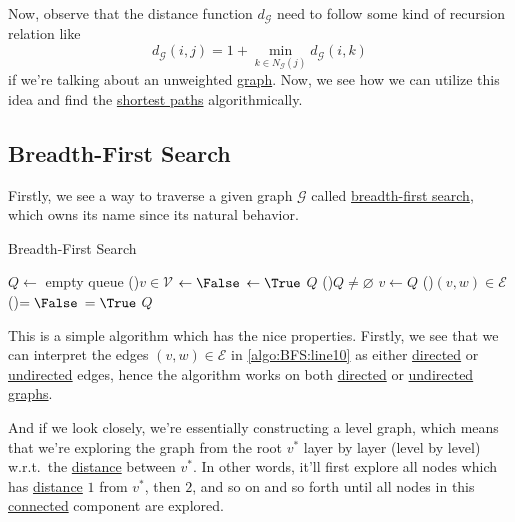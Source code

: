 Now, observe that the distance function \(d_{\mathcal{G} } \) need to follow some kind of recursion relation like
\[
	d_{\mathcal{G} } (i, j) = 1 + \min_{k\in N_{\mathcal{G} } (j)} d_{\mathcal{G} } (i, k)
\]
if we're talking about an unweighted \hyperref[def:graph]{graph}. Now, we see how we can utilize this idea and find the \hyperref[def:shortest-path]{shortest paths} algorithmically.

\subsection{Breadth-First Search}
Firstly, we see a way to traverse a given graph \(\mathcal{G} \) called \hyperref[algo:BFS]{breadth-first search}, which owns its name since its natural behavior.

\begin{algorithm}[H]\label{algo:BFS}
	\DontPrintSemicolon{}
	\caption{Breadth-First Search}
	\BlankLine
	\(Q\gets \) empty queue
	\For(){\(v\in \mathcal{V} \)}{
		\(\gets \False\)
	}
	\;
	\(\gets \True\) 
	\(Q\)\;
	\;
	\While(){\(Q\neq \varnothing \)}{
		\(v\gets Q\)\pop{}\;
		\For(\label{algo:BFS:line10}){\((v, w)\in\mathcal{E}\)}{
			\If(){\(= \False\)}{
				\(=\True\)
				\(Q\)\;
			}
		}
	}
	\Return{}\;
\end{algorithm}

This is a simple algorithm which has the nice properties. Firstly, we see that we can interpret the edges \((v, w)\in \mathcal{E} \) in \autoref{algo:BFS:line10} as either \hyperref[def:directed-graph]{directed} or \hyperref[def:undirected-graph]{undirected} edges, hence the algorithm works on both \hyperref[def:directed-graph]{directed} or \hyperref[def:undirected-graph]{undirected graphs}.

\begin{intuition}
	And if we look closely, we're essentially constructing a level graph, which means that we're exploring the graph from the root \(v^{\ast} \) layer by layer (level by level) w.r.t.\ the \hyperref[def:distance-between-nodes]{distance} between \(v^{\ast}\). In other words, it'll first explore all nodes which has \hyperref[def:distance-between-nodes]{distance} \(1\) from \(v^{\ast} \), then \(2\), and so on and so forth until all nodes in this \hyperref[def:connected]{connected} component are explored.
\end{intuition}

